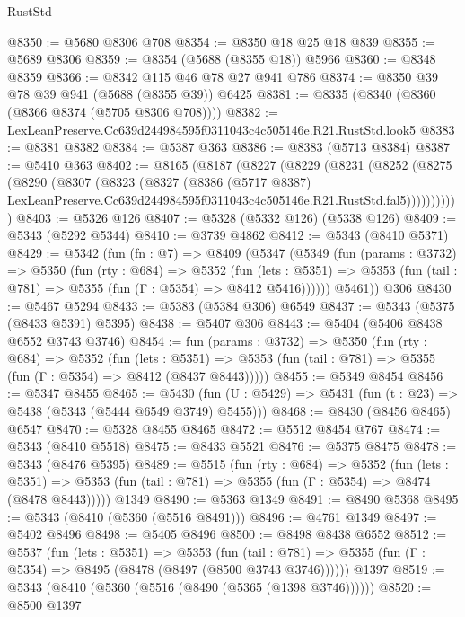 \begin{lexlean}{RustStd}
\begin{coremodule}
@8350 := @5680 @8306 @708
@8354 := @8350 @18 @25 @18 @839
@8355 := @5689 @8306
@8359 := @8354 (@5688 (@8355 @18)) @5966
@8360 := @8348 @8359
@8366 := @8342 @115 @46 @78 @27 @941 @786
@8374 := @8350 @39 @78 @39 @941 (@5688 (@8355 @39)) @6425
@8381 := @8335 (@8340 (@8360 (@8366 @8374 (@5705 @8306 @708))))
@8382 := LexLeanPreserve.Cc639d244984595f0311043c4c505146e.R21.RustStd.look5
@8383 := @8381 @8382
@8384 := @5387 @363
@8386 := @8383 (@5713 @8384)
@8387 := @5410 @363
@8402 := @8165
    (@8187
      (@8227
        (@8229
          (@8231
            (@8252
              (@8275
                (@8290
                  (@8307
                    (@8323
                      (@8327
                        (@8386
                          (@5717 @8387)
                          LexLeanPreserve.Cc639d244984595f0311043c4c505146e.R21.RustStd.fal5)))))))))))
@8403 := @5326 @126
@8407 := @5328 (@5332 @126) (@5338 @126)
@8409 := @5343 (@5292 @5344)
@8410 := @3739 @4862
@8412 := @5343 (@8410 @5371)
@8429 := @5342
    (fun (fn : @7) =>
    @8409
      (@5347
        (@5349
          (fun (params : @3732) =>
          @5350
            (fun (rty : @684) =>
            @5352
              (fun (lets : @5351) =>
              @5353 (fun (tail : @781) => @5355 (fun (Γ : @5354) => @8412 @5416))))))
        @5461))
    @306
@8430 := @5467 @5294
@8433 := @5383 (@5384 @306) @6549
@8437 := @5343 (@5375 (@8433 @5391) @5395)
@8438 := @5407 @306
@8443 := @5404 (@5406 @8438 @6552 @3743 @3746)
@8454 := fun (params : @3732) =>
  @5350
    (fun (rty : @684) =>
    @5352
      (fun (lets : @5351) =>
      @5353 (fun (tail : @781) => @5355 (fun (Γ : @5354) => @8412 (@8437 @8443)))))
@8455 := @5349 @8454
@8456 := @5347 @8455
@8465 := @5430 (fun (U : @5429) => @5431 (fun (t : @23) => @5438 (@5343 (@5444 @6549 @3749) @5455)))
@8468 := @8430 (@8456 @8465) @6547
@8470 := @5328 @8455 @8465
@8472 := @5512 @8454 @767
@8474 := @5343 (@8410 @5518)
@8475 := @8433 @5521
@8476 := @5375 @8475
@8478 := @5343 (@8476 @5395)
@8489 := @5515
    (fun (rty : @684) =>
    @5352
      (fun (lets : @5351) =>
      @5353 (fun (tail : @781) => @5355 (fun (Γ : @5354) => @8474 (@8478 @8443)))))
    @1349
@8490 := @5363 @1349
@8491 := @8490 @5368
@8495 := @5343 (@8410 (@5360 (@5516 @8491)))
@8496 := @4761 @1349
@8497 := @5402 @8496
@8498 := @5405 @8496
@8500 := @8498 @8438 @6552
@8512 := @5537
    (fun (lets : @5351) =>
    @5353
      (fun (tail : @781) => @5355 (fun (Γ : @5354) => @8495 (@8478 (@8497 (@8500 @3743 @3746))))))
    @1397
@8519 := @5343 (@8410 (@5360 (@5516 (@8490 (@5365 (@1398 @3746))))))
@8520 := @8500 @1397

\end{coremodule}
\end{lexlean}
